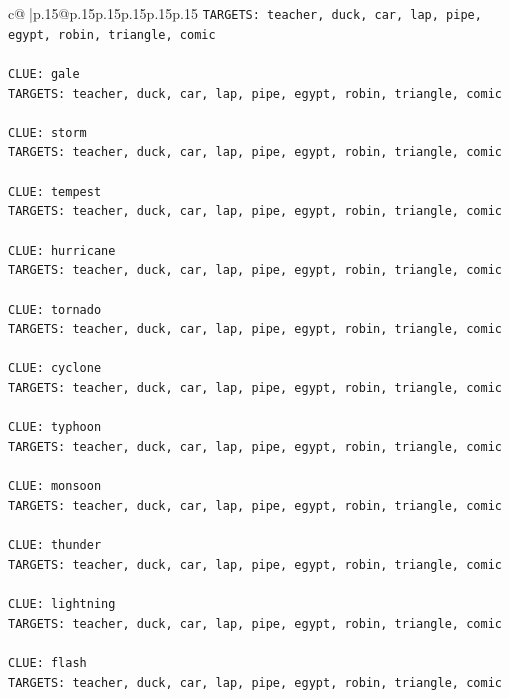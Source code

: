 \documentclass{article}
\begin{document}
{\begin{supertabular}{c@{$\;$}|p{.15\linewidth}@{}p{.15\linewidth}p{.15\linewidth}p{.15\linewidth}p{.15\linewidth}p{.15\linewidth}}
{{{\texttt{TARGETS: teacher, duck, car, lap, pipe, egypt, robin, triangle, comic} \\
\\ 
\texttt{CLUE: gale} \\
\texttt{TARGETS: teacher, duck, car, lap, pipe, egypt, robin, triangle, comic} \\
\\ 
\texttt{CLUE: storm} \\
\texttt{TARGETS: teacher, duck, car, lap, pipe, egypt, robin, triangle, comic} \\
\\ 
\texttt{CLUE: tempest} \\
\texttt{TARGETS: teacher, duck, car, lap, pipe, egypt, robin, triangle, comic} \\
\\ 
\texttt{CLUE: hurricane} \\
\texttt{TARGETS: teacher, duck, car, lap, pipe, egypt, robin, triangle, comic} \\
\\ 
\texttt{CLUE: tornado} \\
\texttt{TARGETS: teacher, duck, car, lap, pipe, egypt, robin, triangle, comic} \\
\\ 
\texttt{CLUE: cyclone} \\
\texttt{TARGETS: teacher, duck, car, lap, pipe, egypt, robin, triangle, comic} \\
\\ 
\texttt{CLUE: typhoon} \\
\texttt{TARGETS: teacher, duck, car, lap, pipe, egypt, robin, triangle, comic} \\
\\ 
\texttt{CLUE: monsoon} \\
\texttt{TARGETS: teacher, duck, car, lap, pipe, egypt, robin, triangle, comic} \\
\\ 
\texttt{CLUE: thunder} \\
\texttt{TARGETS: teacher, duck, car, lap, pipe, egypt, robin, triangle, comic} \\
\\ 
\texttt{CLUE: lightning} \\
\texttt{TARGETS: teacher, duck, car, lap, pipe, egypt, robin, triangle, comic} \\
\\ 
\texttt{CLUE: flash} \\
\texttt{TARGETS: teacher, duck, car, lap, pipe, egypt, robin, triangle, comic} \\
}}}
\end{supertabular}}
\end{document}
